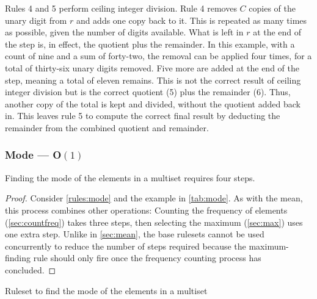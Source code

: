 Rules 4 and 5 perform ceiling integer division.  Rule 4 removes \(C\) copies of the unary digit from \(r\) and adds one copy back to it.  This is repeated as many times as possible, given the number of digits available.  What is left in \(r\) at the end of the step is, in effect, the quotient plus the remainder.  In this example, with a count of nine and a sum of forty-two, the removal can be applied four times, for a total of thirty-six unary digits removed.  Five more are added at the end of the step, meaning a total of eleven remains.  This is not the correct result of ceiling integer division but is the correct quotient (5) plus the remainder (6).  Thus, another copy of the total is kept and divided, without the quotient added back in.  This leaves rule 5 to compute the correct final result by deducting the remainder from the combined quotient and remainder.

\subsubsection{Mode --- O\((1)\)}  \label{sec:mode}

\begin{proposition}\label{prop:mode}
Finding the mode of the elements in a multiset requires four steps.
\end{proposition}

\begin{proof}
Consider \cref{rules:mode} and the example in \cref{tab:mode}.  As with the mean, this process combines other operations:  Counting the frequency of elements (\cref{sec:countfreq}) takes three steps, then selecting the maximum (\cref{sec:max}) uses one extra step.  Unlike in \cref{sec:mean}, the base rulesets cannot be used concurrently to reduce the number of steps required because the maximum-finding rule should only fire once the frequency counting process has concluded.
\end{proof}

\cpresetrulenumber
\begin{cprulesetfloat} \begin{cpruleset}




\end{cpruleset}
\caption{\label{rules:mode}Ruleset to find the mode of the elements in a multiset}
\end{cprulesetfloat}

